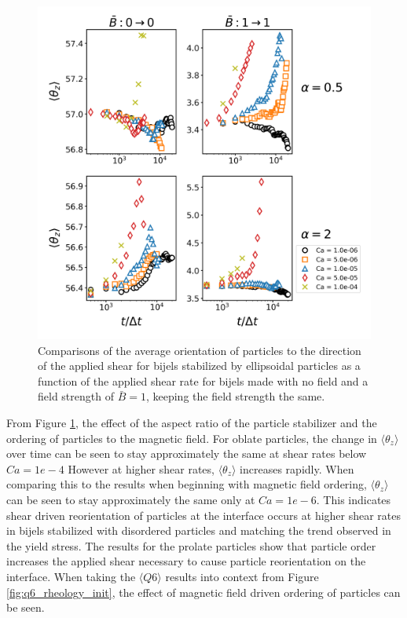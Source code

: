 \begin{figure} 
    \centering 
    \includegraphics[scale=0.5]{../figures/results/paper3/theta_z-time_compare-specific.png} 
    \caption{Comparisons of the average orientation of particles to the direction of the applied shear for bijels stabilized by
             ellipsoidal particles as a function of the applied shear rate for bijels made with no field and a field strength of $\bar{B} = 1$,
             keeping the field strength the same.} 
    \label{fig:theta_z_specific} 
\end{figure}

From Figure \ref{fig:theta_z_specific}, the effect of the aspect ratio of the particle stabilizer and the ordering of particles to the magnetic field. For oblate 
particles, the change in $\langle \theta_z \rangle$ over time can be seen to stay approximately the same at shear rates below $Ca = 1e-4$ However at higher shear rates,
$\langle \theta_z \rangle$ increases rapidly. When comparing this to the results when beginning with magnetic field ordering, $\langle \theta_z \rangle$ can be seen to
stay approximately the same only at $Ca = 1e-6$. This indicates shear driven reorientation of particles at the interface occurs at higher shear rates in bijels stabilized
with disordered particles and matching the trend observed in the yield stress. The results for the prolate particles show that particle order increases the applied shear
necessary to cause particle reorientation on the interface. When taking the $\langle Q6 \rangle$ results into context from Figure \ref{fig:q6_rheology_init}, 
the effect of magnetic field driven ordering of particles can be seen.

